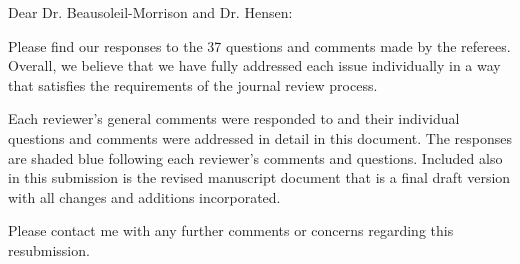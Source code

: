 

\opening{Dear Dr. Beausoleil-Morrison and Dr. Hensen:}


\begin{newlfm}
Please find our responses to the 37 questions and comments made by the referees. Overall, we believe that we have fully addressed each issue individually in a way that satisfies the requirements of the journal review process. 

Each reviewer's general comments were responded to and their individual questions and comments were addressed in detail in this document. The responses are shaded blue following each reviewer's comments and questions. Included also in this submission is the revised manuscript document that is a final draft version with all changes and additions incorporated.

Please contact me with any further comments or concerns regarding this resubmission.

\end{newlfm}
